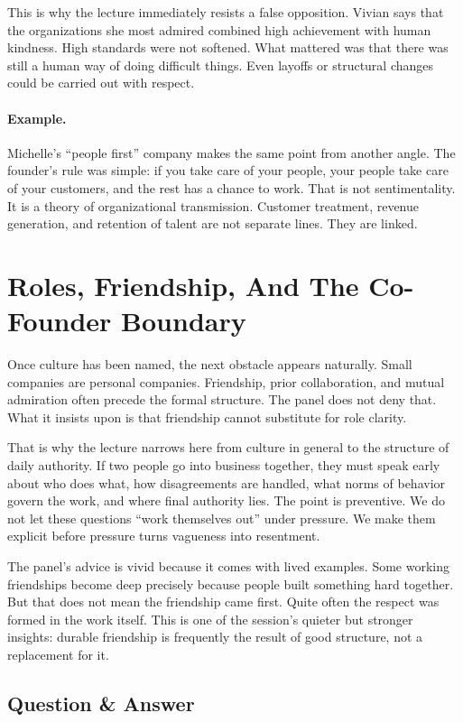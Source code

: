 This is why the lecture immediately resists a false opposition. Vivian says that the organizations she most admired combined high achievement with human kindness. High standards were not softened. What mattered was that there was still a human way of doing difficult things. Even layoffs or structural changes could be carried out with respect.

\paragraph{Example.} Michelle's ``people first'' company makes the same point from another angle. The founder's rule was simple: if you take care of your people, your people take care of your customers, and the rest has a chance to work. That is not sentimentality. It is a theory of organizational transmission. Customer treatment, revenue generation, and retention of talent are not separate lines. They are linked.

\section{Roles, Friendship, And The Co-Founder Boundary}

Once culture has been named, the next obstacle appears naturally. Small companies are personal companies. Friendship, prior collaboration, and mutual admiration often precede the formal structure. The panel does not deny that. What it insists upon is that friendship cannot substitute for role clarity.

That is why the lecture narrows here from culture in general to the structure of daily authority. If two people go into business together, they must speak early about who does what, how disagreements are handled, what norms of behavior govern the work, and where final authority lies. The point is preventive. We do not let these questions ``work themselves out'' under pressure. We make them explicit before pressure turns vagueness into resentment.

The panel's advice is vivid because it comes with lived examples. Some working friendships become deep precisely because people built something hard together. But that does not mean the friendship came first. Quite often the respect was formed in the work itself. This is one of the session's quieter but stronger insights: durable friendship is frequently the result of good structure, not a replacement for it.

\subsection{Question \& Answer}

